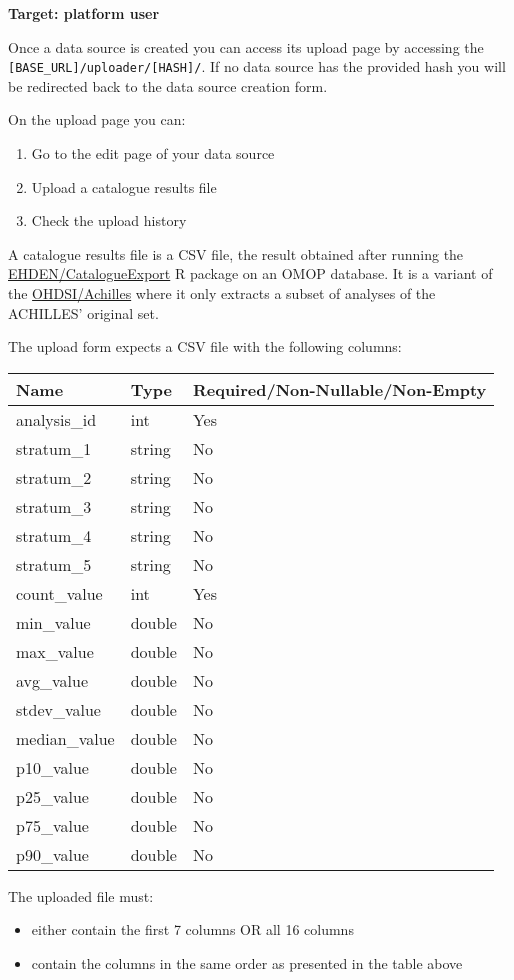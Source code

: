 \documentclass[
]{book}
\providecommand{\tightlist}{%
  \setlength{\itemsep}{0pt}\setlength{\parskip}{0pt}}
\begin{document}
\textbf{Target: platform user}

Once a data source is created you can access its upload page by accessing the \texttt{{[}BASE\_URL{]}/uploader/{[}HASH{]}/}. If no data source has the provided hash you will be redirected back to the data source creation form.

On the upload page you can:

\begin{enumerate}
\def\labelenumi{\arabic{enumi}.}
\tightlist
\item
  Go to the edit page of your data source
\item
  Upload a catalogue results file
\item
  Check the upload history
\end{enumerate}

A catalogue results file is a CSV file, the result obtained after running the \href{https://github.com/EHDEN/CatalogueExport}{EHDEN/CatalogueExport} R package on an OMOP database. It is a variant of the \href{https://github.com/OHDSI/Achilles}{OHDSI/Achilles} where it only extracts a subset of analyses of the ACHILLES' original set.

The upload form expects a CSV file with the following columns:

\begin{longtable}[]{@{}lll@{}}
\toprule
Name & Type & Required/Non-Nullable/Non-Empty\tabularnewline
\midrule
\endhead
analysis\_id & int & Yes\tabularnewline
stratum\_1 & string & No\tabularnewline
stratum\_2 & string & No\tabularnewline
stratum\_3 & string & No\tabularnewline
stratum\_4 & string & No\tabularnewline
stratum\_5 & string & No\tabularnewline
count\_value & int & Yes\tabularnewline
min\_value & double & No\tabularnewline
max\_value & double & No\tabularnewline
avg\_value & double & No\tabularnewline
stdev\_value & double & No\tabularnewline
median\_value & double & No\tabularnewline
p10\_value & double & No\tabularnewline
p25\_value & double & No\tabularnewline
p75\_value & double & No\tabularnewline
p90\_value & double & No\tabularnewline
\bottomrule
\end{longtable}

The uploaded file must:

\begin{itemize}
\item
  either contain the first 7 columns OR all 16 columns
\item
  contain the columns in the same order as presented in the table above
\end{itemize}
\end{document}
